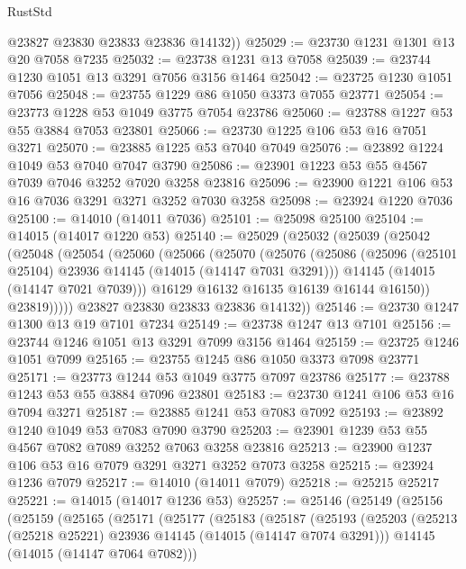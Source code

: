 \begin{lexlean}{RustStd}
\begin{coremodule}
        @23827
        @23830
        @23833
        @23836
        @14132))
@25029 := @23730 @1231 @1301 @13 @20 @7058 @7235
@25032 := @23738 @1231 @13 @7058
@25039 := @23744 @1230 @1051 @13 @3291 @7056 @3156 @1464
@25042 := @23725 @1230 @1051 @7056
@25048 := @23755 @1229 @86 @1050 @3373 @7055 @23771
@25054 := @23773 @1228 @53 @1049 @3775 @7054 @23786
@25060 := @23788 @1227 @53 @55 @3884 @7053 @23801
@25066 := @23730 @1225 @106 @53 @16 @7051 @3271
@25070 := @23885 @1225 @53 @7040 @7049
@25076 := @23892 @1224 @1049 @53 @7040 @7047 @3790
@25086 := @23901 @1223 @53 @55 @4567 @7039 @7046 @3252 @7020 @3258 @23816
@25096 := @23900 @1221 @106 @53 @16 @7036 @3291 @3271 @3252 @7030 @3258
@25098 := @23924 @1220 @7036
@25100 := @14010 (@14011 @7036)
@25101 := @25098 @25100
@25104 := @14015 (@14017 @1220 @53)
@25140 := @25029
    (@25032
      (@25039
        (@25042
          (@25048
            (@25054
              (@25060
                (@25066
                  (@25070
                    (@25076
                      (@25086
                        (@25096 (@25101 @25104) @23936 @14145 (@14015 (@14147 @7031 @3291)))
                        @14145
                        (@14015 (@14147 @7021 @7039)))
                      @16129
                      @16132
                      @16135
                      @16139
                      @16144
                      @16150))
                  @23819)))))
        @23827
        @23830
        @23833
        @23836
        @14132))
@25146 := @23730 @1247 @1300 @13 @19 @7101 @7234
@25149 := @23738 @1247 @13 @7101
@25156 := @23744 @1246 @1051 @13 @3291 @7099 @3156 @1464
@25159 := @23725 @1246 @1051 @7099
@25165 := @23755 @1245 @86 @1050 @3373 @7098 @23771
@25171 := @23773 @1244 @53 @1049 @3775 @7097 @23786
@25177 := @23788 @1243 @53 @55 @3884 @7096 @23801
@25183 := @23730 @1241 @106 @53 @16 @7094 @3271
@25187 := @23885 @1241 @53 @7083 @7092
@25193 := @23892 @1240 @1049 @53 @7083 @7090 @3790
@25203 := @23901 @1239 @53 @55 @4567 @7082 @7089 @3252 @7063 @3258 @23816
@25213 := @23900 @1237 @106 @53 @16 @7079 @3291 @3271 @3252 @7073 @3258
@25215 := @23924 @1236 @7079
@25217 := @14010 (@14011 @7079)
@25218 := @25215 @25217
@25221 := @14015 (@14017 @1236 @53)
@25257 := @25146
    (@25149
      (@25156
        (@25159
          (@25165
            (@25171
              (@25177
                (@25183
                  (@25187
                    (@25193
                      (@25203
                        (@25213 (@25218 @25221) @23936 @14145 (@14015 (@14147 @7074 @3291)))
                        @14145
                        (@14015 (@14147 @7064 @7082)))

\end{coremodule}
\end{lexlean}
